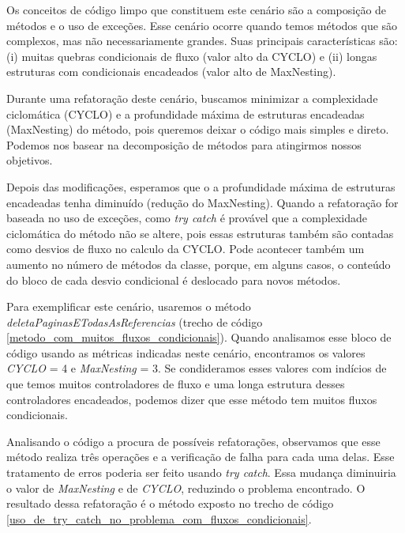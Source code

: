 Os conceitos de código limpo que constituem este cenário são a composição de métodos e o uso de exceções. Esse cenário ocorre quando temos métodos que são complexos, mas não necessariamente grandes. Suas principais características são: (i) muitas quebras condicionais de fluxo (valor alto da CYCLO) e (ii) longas estruturas com condicionais encadeados (valor alto de MaxNesting).
                                                                                 
Durante uma refatoração deste cenário, buscamos minimizar a complexidade ciclomática (CYCLO) e a profundidade máxima de estruturas encadeadas (MaxNesting) do método, pois queremos deixar o código mais simples e direto. Podemos nos basear na decomposição de métodos para atingirmos nossos objetivos.
	
Depois das modificações, esperamos que o a profundidade máxima de estruturas encadeadas tenha diminuído (redução do MaxNesting). Quando a refatoração for baseada no uso de exceções, como \textit{try catch} é provável que a complexidade ciclomática do método não se altere, pois essas estruturas também são contadas como desvios de fluxo no calculo da CYCLO. Pode acontecer também um aumento no número de métodos da classe, porque, em alguns casos, o conteúdo do bloco de cada desvio condicional é deslocado para novos métodos. 
           
Para exemplificar este cenário, usaremos o método \textit{deletaPaginasETodasAsReferencias} (trecho de código \ref{metodo_com_muitos_fluxos_condicionais}). Quando analisamos esse bloco de código usando as métricas indicadas neste cenário, encontramos os valores \textit{CYCLO} = 4 e \textit{MaxNesting} = 3. Se condideramos esses valores com indícios de que temos muitos controladores de fluxo e uma longa estrutura desses controladores encadeados, podemos dizer que esse método tem muitos fluxos condicionais. 
                                                                                          
               
                                                                                          
Analisando o código a procura de possíveis refatorações, observamos que esse método realiza três operações e a verificação de falha para cada uma delas. Esse tratamento de erros poderia ser feito usando \textit{try catch}. Essa mudança diminuiria o valor de \textit{MaxNesting} e de \textit{CYCLO}, reduzindo o problema encontrado. O resultado dessa refatoração é o método exposto no trecho de código \ref{uso_de_try_catch_no_problema_com_fluxos_condicionais}.
                                                         
